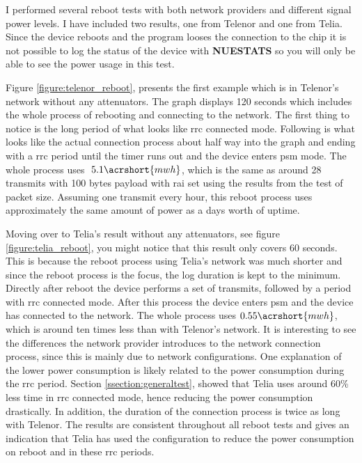\documentclass[USenglish]{ifimaster}  %
\begin{document}
I performed several reboot tests with both network providers and different signal power levels. I have included two results, one from Telenor and one from Telia. Since the device reboots and the program looses the connection to the chip it is not possible to log the status of the device with \textbf{NUESTATS} so you will only be able to see the power usage in this test.

Figure \vref{figure:telenor_reboot}, presents the first example which is in Telenor's network without any attenuators. The graph displays 120 seconds which includes the whole process of rebooting and connecting to the network. The first thing to notice is the long period of what looks like \acrshort{rrc} connected mode. Following is what looks like the actual connection process about half way into the graph and ending with a \acrshort{rrc} period until the timer runs out and the device enters \acrshort{psm} mode. The whole process uses ${~5.1 \acrshort{mwh}}$, which is the same as around 28 transmits with 100 bytes payload with \acrshort{rai} set using the results from the test of packet size. Assuming one transmit every hour, this reboot process uses approximately the same amount of power as a days worth of uptime.

Moving over to Telia's result without any attenuators, see figure \vref{figure:telia_reboot}, you might notice that this result only covers 60 seconds. This is because the reboot process using Telia's network was much shorter and since the reboot process is the focus, the log duration is kept to the minimum. Directly after reboot the device performs a set of transmits, followed by a period with \acrshort{rrc} connected mode. After this process the device enters \acrshort{psm} and the device has connected to the network. The whole process uses ${0.55 \acrshort{mwh}}$, which is around ten times less than with Telenor's network. It is interesting to see the differences the network provider introduces to the network connection process, since this is mainly due to network configurations. One explanation of the lower power consumption is likely related to the power consumption during the \acrshort{rrc} period. Section \vref{ssection:generaltest}, showed that Telia uses around 60\% less time in \acrshort{rrc} connected mode, hence reducing the power consumption drastically. In addition, the duration of the connection process is twice as long with Telenor. The results are consistent throughout all reboot tests and gives an indication that Telia has used the configuration to reduce the power consumption on reboot and in these \acrshort{rrc} periods.
\end{document}
